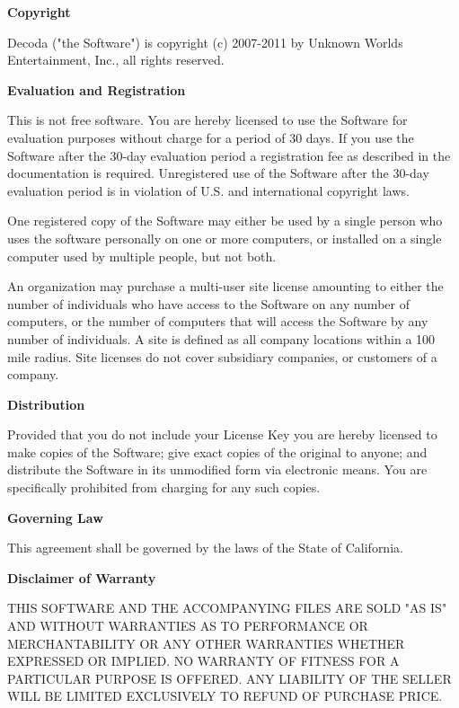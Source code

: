\textbf{Copyright}

Decoda ("the Software") is copyright (c) 2007-2011 by Unknown Worlds Entertainment, Inc., all
rights reserved.

\textbf{Evaluation and Registration}

This is not free software.  You are hereby licensed to use the Software for evaluation
purposes without charge for a period of 30 days.  If you use the Software after the 30-day
evaluation period a registration fee as described in the documentation is required.
Unregistered use of the Software after the 30-day evaluation period is in violation of
U.S. and international copyright laws.

One registered copy of the Software may either be used by a single person who uses the
software personally on one or more computers, or installed on a single computer used by
multiple people, but not both.

An organization may purchase a multi-user site license amounting to either the number of
individuals who have access to the Software on any number of computers, or the number of
computers that will access the Software by any number of individuals.  A site is defined
as all company locations within a 100 mile radius. Site licenses do not cover subsidiary
companies, or customers of a company.

\textbf{Distribution}

Provided that you do not include your License Key you are hereby licensed to make copies
of the Software; give exact copies of the original to anyone; and distribute the Software
in its unmodified form via electronic means.  You are specifically prohibited from charging
for any such copies.

\textbf{Governing Law}

This agreement shall be governed by the laws of the State of California.

\textbf{Disclaimer of Warranty}

THIS SOFTWARE AND THE ACCOMPANYING FILES ARE SOLD "AS IS" AND WITHOUT WARRANTIES AS TO
PERFORMANCE OR MERCHANTABILITY OR ANY OTHER WARRANTIES WHETHER EXPRESSED OR IMPLIED.  NO
WARRANTY OF FITNESS FOR A PARTICULAR PURPOSE IS OFFERED.  ANY LIABILITY OF THE SELLER WILL
BE LIMITED EXCLUSIVELY TO REFUND OF PURCHASE PRICE.


